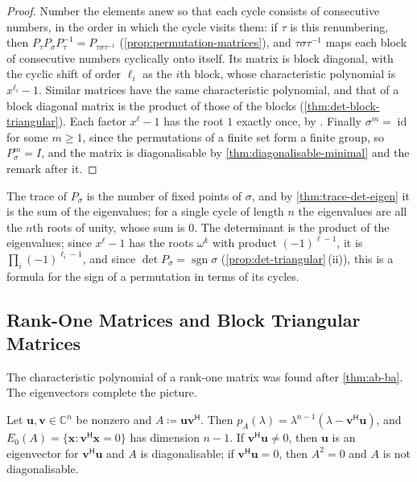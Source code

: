 \begin{proof}
Number the elements anew so that each cycle consists of consecutive numbers, in the order in which the cycle visits them: if $\tau$ is this renumbering, then $P_\tau P_\sigma P_\tau^{-1}=P_{\tau\sigma\tau^{-1}}$ (\cref{prop:permutation-matrices}), and $\tau\sigma\tau^{-1}$ maps each block of consecutive numbers cyclically onto itself. Its matrix is block diagonal, with the cyclic shift of order $\ell_i$ as the $i$th block, whose characteristic polynomial is $x^{\ell_i}-1$. Similar matrices have the same characteristic polynomial, and that of a block diagonal matrix is the product of those of the blocks (\cref{thm:det-block-triangular}). Each factor $x^{\ell}-1$ has the root $1$ exactly once, by . Finally $\sigma^m=\operatorname{id}$ for some $m\ge1$, since the permutations of a finite set form a finite group, so $P_\sigma^m=I$, and the matrix is diagonalisable by \cref{thm:diagonalisable-minimal} and the remark after it.
\end{proof}

The trace of $P_\sigma$ is the number of fixed points of $\sigma$, and by \cref{thm:trace-det-eigen} it is the sum of the eigenvalues; for a single cycle of length $n$ the eigenvalues are all the $n$th roots of unity, whose sum is $0$. The determinant is the product of the eigenvalues; since $x^\ell-1$ has the roots $\omega^k$ with product $(-1)^{\ell-1}$, it is $\prod_i(-1)^{\ell_i-1}$, and since $\det P_\sigma=\operatorname{sgn}\sigma$ (\cref{prop:det-triangular}\,(ii)), this is a formula for the sign of a permutation in terms of its cycles.

\subsection{Rank-One Matrices and Block Triangular Matrices}

The characteristic polynomial of a rank-one matrix was found after \cref{thm:ab-ba}. The eigenvectors complete the picture.

\begin{proposition}
\label{prop:rank-one-eigen}
Let $\mathbf u,\mathbf v\in\mathbb C^n$ be nonzero and $A\coloneqq\mathbf u\mathbf v^{\mathsf H}$. Then $p_A(\lambda)=\lambda^{n-1}(\lambda-\mathbf v^{\mathsf H}\mathbf u)$, and $E_0(A)=\{\mathbf x:\mathbf v^{\mathsf H}\mathbf x=0\}$ has dimension $n-1$. If $\mathbf v^{\mathsf H}\mathbf u\ne0$, then $\mathbf u$ is an eigenvector for $\mathbf v^{\mathsf H}\mathbf u$ and $A$ is diagonalisable; if $\mathbf v^{\mathsf H}\mathbf u=0$, then $A^2=0$ and $A$ is not diagonalisable.
\end{proposition}

